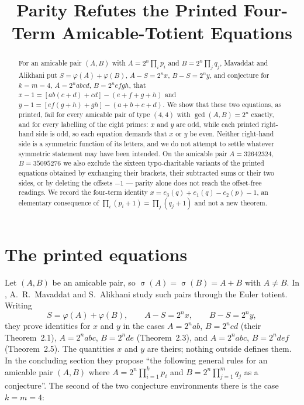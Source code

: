 \documentclass[11pt]{amsart}
\title[Parity refutes the printed four-term equations]
{Parity Refutes the Printed Four-Term Amicable-Totient Equations}
\date{}
\theoremstyle{remark}
\DeclareMathOperator{\sig}{\sigma}
\begin{document}
\begin{abstract}
For an amicable pair $(A,B)$ with $A=2^n\!\prod_i p_i$ and $B=2^n\!\prod_j q_j$,
Mavaddat and Alikhani put $S=\varphi(A)+\varphi(B)$, $A-S=2^nx$, $B-S=2^ny$, and
conjecture for $k=m=4$, $A=2^nabcd$, $B=2^nefgh$, that
$x-1=[ab(c+d)+cd]-(e+f+g+h)$ and $y-1=[ef(g+h)+gh]-(a+b+c+d)$.
We show that these two equations, as printed, fail for every amicable pair of
type $(4,4)$ with $\gcd(A,B)=2^n$ exactly, and for every labelling of the eight
primes: $x$ and $y$ are odd, while each printed right-hand side is odd, so each
equation demands that $x$ or $y$ be even. Neither right-hand side is a symmetric
function of its letters, and we do not attempt to settle whatever symmetric
statement may have been intended. On the amicable pair $A=32642324$,
$B=35095276$ we also exclude the sixteen typo-charitable variants of the printed
equations obtained by exchanging their brackets, their subtracted sums or their
two sides, or by deleting the offsets $-1$ --- parity alone does not reach the
offset-free readings. We record the four-term identity
$x=e_3(q)+e_1(q)-e_2(p)-1$, an elementary consequence of
$\prod_i(p_i+1)=\prod_j(q_j+1)$ and not a new theorem.
\end{abstract}

\maketitle

\section{The printed equations}

Let $(A,B)$ be an amicable pair, so $\sig(A)=\sig(B)=A+B$ with $A\neq B$. In
\cite{MA}, A.~R.~Mavaddat and S.~Alikhani study such pairs through the Euler
totient. Writing
\begin{equation}\label{eq:xy}
 S=\varphi(A)+\varphi(B),
 \qquad
 A-S=2^nx,
 \qquad
 B-S=2^ny,
\end{equation}
they prove identities for $x$ and $y$ in the cases $A=2^nab$, $B=2^ncd$
(their Theorem~2.1), $A=2^nabc$, $B=2^nde$ (Theorem~2.3), and $A=2^nabc$,
$B=2^ndef$ (Theorem~2.5). The quantities $x$ and $y$ are theirs; nothing outside
\cite{MA} defines them. In the concluding section they propose ``the following
general rules for an amicable pair $(A,B)$ where $A=2^n\prod_{i=1}^{k}p_i$ and
$B=2^n\prod_{j=1}^{m}q_j$ as a conjecture''. The second of the two conjecture
environments there is the case $k=m=4$:
\end{document}
